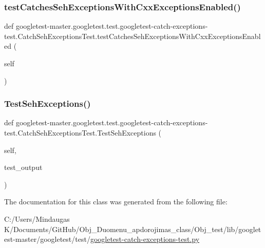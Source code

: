 \subsubsection{\texorpdfstring{testCatchesSehExceptionsWithCxxExceptionsEnabled()}{testCatchesSehExceptionsWithCxxExceptionsEnabled()}}
{\footnotesize\ttfamily def googletest-\/master.\+googletest.\+test.\+googletest-\/catch-\/exceptions-\/test.\+Catch\+Seh\+Exceptions\+Test.\+test\+Catches\+Seh\+Exceptions\+With\+Cxx\+Exceptions\+Enabled (\begin{DoxyParamCaption}\item[{}]{self }\end{DoxyParamCaption})}

\mbox{\label{classgoogletest-master_1_1googletest_1_1test_1_1googletest-catch-exceptions-test_1_1_catch_seh_exceptions_test_a26f39a99949e7d3c78e40c8bc56c127d}} 
\subsubsection{\texorpdfstring{TestSehExceptions()}{TestSehExceptions()}}
{\footnotesize\ttfamily def googletest-\/master.\+googletest.\+test.\+googletest-\/catch-\/exceptions-\/test.\+Catch\+Seh\+Exceptions\+Test.\+Test\+Seh\+Exceptions (\begin{DoxyParamCaption}\item[{}]{self,  }\item[{}]{test\+\_\+output }\end{DoxyParamCaption})}



The documentation for this class was generated from the following file\+:\begin{DoxyCompactItemize}
\item 
C\+:/\+Users/\+Mindaugas K/\+Documents/\+Git\+Hub/\+Obj\+\_\+\+Duomenu\+\_\+apdorojimas\+\_\+class/\+Obj\+\_\+test/lib/googletest-\/master/googletest/test/\mbox{\hyperlink{_obj__test_2lib_2googletest-master_2googletest_2test_2googletest-catch-exceptions-test_8py}{googletest-\/catch-\/exceptions-\/test.\+py}}\end{DoxyCompactItemize}
